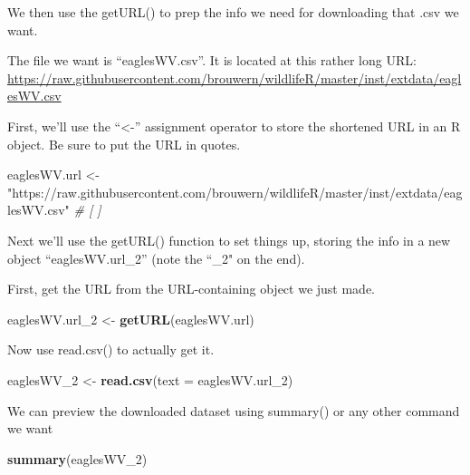 \documentclass[]{book}
\newenvironment{Shaded}{\begin{snugshade}}{\end{snugshade}}
\newcommand{\KeywordTok}[1]{\textcolor[rgb]{0.13,0.29,0.53}{\textbf{#1}}}
\newcommand{\DataTypeTok}[1]{\textcolor[rgb]{0.13,0.29,0.53}{#1}}
\newcommand{\DecValTok}[1]{\textcolor[rgb]{0.00,0.00,0.81}{#1}}
\newcommand{\StringTok}[1]{\textcolor[rgb]{0.31,0.60,0.02}{#1}}
\newcommand{\CommentTok}[1]{\textcolor[rgb]{0.56,0.35,0.01}{\textit{#1}}}
\newcommand{\NormalTok}[1]{#1}
\theoremstyle{definition}
\theoremstyle{definition}
\theoremstyle{definition}
\theoremstyle{remark}
\begin{document}
We then use the getURL() to prep the info we need for downloading that
.csv we want.

The file we want is ``eaglesWV.csv''. It is located at this rather long
URL:\\
\url{https://raw.githubusercontent.com/brouwern/wildlifeR/master/inst/extdata/eaglesWV.csv}

First, we'll use the ``\textless{}-'' assignment operator to store the
shortened URL in an R object. Be sure to put the URL in quotes.

\begin{Shaded}
\begin{Highlighting}[]
\NormalTok{eaglesWV.url <-}\StringTok{ "https://raw.githubusercontent.com/brouwern/wildlifeR/master/inst/extdata/eaglesWV.csv"} \CommentTok{# [ ]}
\end{Highlighting}
\end{Shaded}

Next we'll use the getURL() function to set things up, storing the info
in a new object ``eaglesWV.url\_2'' (note the ``\_2" on the end).

First, get the URL from the URL-containing object we just made.

\begin{Shaded}
\begin{Highlighting}[]
\NormalTok{eaglesWV.url_}\DecValTok{2}\NormalTok{ <-}\StringTok{ }\KeywordTok{getURL}\NormalTok{(eaglesWV.url)}
\end{Highlighting}
\end{Shaded}

Now use read.csv() to actually get it.

\begin{Shaded}
\begin{Highlighting}[]
\NormalTok{eaglesWV_}\DecValTok{2}\NormalTok{ <-}\StringTok{ }\KeywordTok{read.csv}\NormalTok{(}\DataTypeTok{text =}\NormalTok{ eaglesWV.url_}\DecValTok{2}\NormalTok{)}
\end{Highlighting}
\end{Shaded}

We can preview the downloaded dataset using summary() or any other
command we want

\begin{Shaded}
\begin{Highlighting}[]
\KeywordTok{summary}\NormalTok{(eaglesWV_}\DecValTok{2}\NormalTok{)}
\end{Highlighting}
\end{Shaded}
\end{document}
